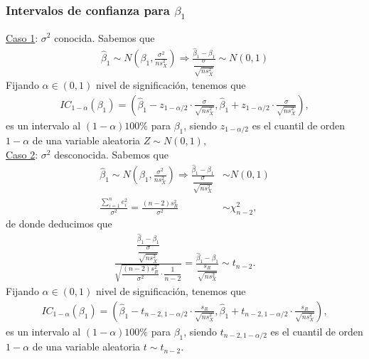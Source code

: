 \subsubsection{Intervalos de confianza para $\beta_1$}

\noindent \underline{Caso 1}: $\sigma^2$ conocida. Sabemos que 
\begin{align*}
    \widehat{\beta}_1 \sim N \left( \beta_1, \frac{\sigma^2}{ns_X^2} \right) \Longrightarrow \frac{\widehat{\beta}_1 - \beta_1}{\dfrac{\sigma}{\sqrt{ns_X^2}}} \sim N(0,1)
\end{align*}
Fijando $\alpha \in (0,1)$ nivel de significación, tenemos que 
\begin{align*}
    IC_{1-\alpha}(\beta_1) = \left( \widehat{\beta}_1 - z_{1 - \alpha/2} \cdot \frac{\sigma}{\sqrt{ns_X^2}}, \widehat{\beta}_1 + z_{1 - \alpha/2} \cdot \frac{\sigma}{\sqrt{ns_X^2}} \right),
\end{align*}
es un intervalo al $(1- \alpha) 100 \%$ para $\beta_1$, siendo $z_{1 - \alpha/2}$ es el cuantil de orden $1 - \alpha$ de una variable aleatoria $Z \sim N(0,1)$, 
\\
\newline
\noindent \underline{Caso 2}: $\sigma^2$ desconocida. Sabemos que
\begin{align*}
    \widehat{\beta}_1 \sim N \left( \beta_1, \frac{\sigma^2}{ns_X^2} \right) \Longrightarrow \frac{\widehat{\beta}_1 - \beta_1}{\dfrac{\sigma}{\sqrt{ns_X^2}}} &\sim N(0,1) \\
    \frac{\sum_{i=1}^{n} e_i^2}{\sigma^2} = \frac{(n-2)s_R^2}{\sigma^2} &\sim \chi_{n-2}^2,
\end{align*}
de donde deducimos que
\begin{align*}
    \frac{\dfrac{\widehat{\beta}_1 - \beta_1}{\dfrac{\sigma}{\sqrt{ns_X^2}}}}{\sqrt{\dfrac{(n-2)s_R^2}{\sigma^2}} \cdot \dfrac{1}{n-2}} = \frac{\widehat{\beta}_1 - \beta_1}{\dfrac{s_R}{\sqrt{ns_X^2}}} \sim t_{n-2}.
\end{align*}
Fijando $\alpha \in (0,1)$ nivel de significación, tenemos que 
\begin{align*}
    IC_{1-\alpha}(\beta_1) = \left( \widehat{\beta}_1 - t_{n-2,1 - \alpha/2} \cdot \frac{s_R}{\sqrt{ns_X^2}}, \widehat{\beta}_1 + t_{n-2,1 - \alpha/2} \cdot \frac{s_R}{\sqrt{ns_X^2}} \right),
\end{align*}
es un intervalo al $(1- \alpha) 100 \%$ para $\beta_1$, siendo $t_{n-2,1 - \alpha/2}$ es el cuantil de orden $1 - \alpha$ de una variable aleatoria $t \sim t_{n-2}$.

